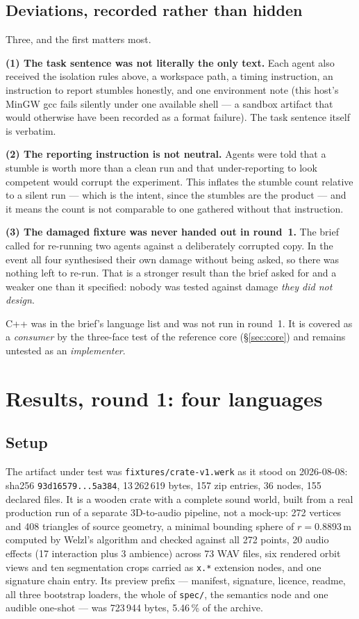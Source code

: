 \documentclass[10pt,twocolumn,letterpaper]{article}
\newcommand{\code}[1]{\texttt{\small #1}}
\begin{document}
\subsection{Deviations, recorded rather than hidden}

Three, and the first matters most.

\textbf{(1) The task sentence was not literally the only text.} Each agent also
received the isolation rules above, a workspace path, a timing instruction, an
instruction to report stumbles honestly, and one environment note (this host's
MinGW gcc fails silently under one available shell --- a sandbox artifact that
would otherwise have been recorded as a format failure). The task sentence itself
is verbatim.

\textbf{(2) The reporting instruction is not neutral.} Agents were told that a
stumble is worth more than a clean run and that under-reporting to look competent
would corrupt the experiment. This inflates the stumble count relative to a silent
run --- which is the intent, since the stumbles are the product --- and it means
the count is not comparable to one gathered without that instruction.

\textbf{(3) The damaged fixture was never handed out in round~1.} The brief called
for re-running two agents against a deliberately corrupted copy. In the event all
four synthesised their own damage without being asked, so there was nothing left to
re-run. That is a stronger result than the brief asked for and a weaker one than it
specified: nobody was tested against damage \emph{they did not design}.

C++ was in the brief's language list and was not run in round~1. It is covered as
a \emph{consumer} by the three-face test of the reference core (\S\ref{sec:core})
and remains untested as an \emph{implementer}.

\section{Results, round 1: four languages}
\label{sec:round1}

\subsection{Setup}

The artifact under test was \code{fixtures/crate-v1.werk} as it stood on
2026-08-08: sha256 \code{93d16579...5a384}, 13\,262\,619 bytes, 157 zip entries,
36 nodes, 155 declared files. It is a wooden crate with a complete sound world,
built from a real production run of a separate 3D-to-audio pipeline, not a
mock-up: 272 vertices and 408 triangles of source geometry, a minimal bounding
sphere of $r = 0.8893$\,m computed by Welzl's algorithm and checked against all
272 points, 20 audio effects (17 interaction plus 3 ambience) across 73 WAV files,
six rendered orbit views and ten segmentation crops carried as \code{x.*}
extension nodes, and one signature chain entry. Its preview prefix --- manifest,
signature, licence, readme, all three bootstrap loaders, the whole of
\code{spec/}, the semantics node and one audible one-shot --- was 723\,944 bytes,
5.46\,\% of the archive.
\end{document}
